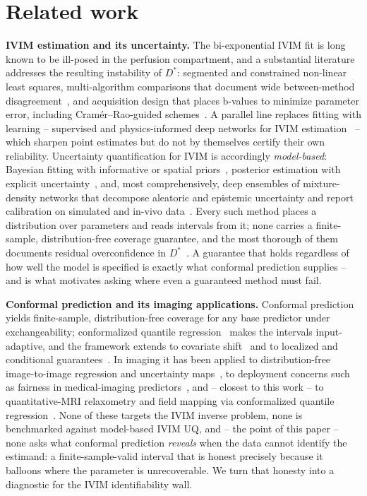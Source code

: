 \documentclass[11pt]{article}
\newcommand{\Dstar}{D^{*}}
\begin{document}
\section{Related work}\label{sec:related}
\textbf{IVIM estimation and its uncertainty.} The bi-exponential IVIM fit is long
known to be ill-posed in the perfusion compartment, and a substantial literature
addresses the resulting instability of $\Dstar$: segmented and constrained
non-linear least squares, multi-algorithm comparisons that document wide
between-method disagreement~\citep{gurneychampion2018}, and acquisition design that
places b-values to minimize parameter error, including Cram\'er--Rao-guided
schemes~\citep{lemke2011}. A parallel line replaces fitting with learning --
supervised and physics-informed deep networks for IVIM
estimation~\citep{barbieri2020,kaandorp2021,mastropietro2022} -- which sharpen
point estimates but do not by themselves certify their own reliability.
Uncertainty quantification for IVIM is accordingly \emph{model-based}: Bayesian
fitting with informative or spatial priors~\citep{gustafsson2018,spinner2021},
posterior estimation with explicit uncertainty~\citep{zhang2019}, and, most
comprehensively, deep ensembles of mixture-density networks that decompose
aleatoric and epistemic uncertainty and report calibration on simulated and in-vivo
data~\citep{casali2026}. Every such method places a distribution over parameters
and reads intervals from it; none carries a finite-sample, distribution-free
coverage guarantee, and the most thorough of them documents residual overconfidence
in $\Dstar$~\citep{casali2026}. A guarantee that holds regardless of how well the
model is specified is exactly what conformal prediction supplies -- and is what
motivates asking where even a guaranteed method must fail.

\textbf{Conformal prediction and its imaging applications.} Conformal
prediction~\citep{vovk2005,lei2018,angelopoulos2023} yields finite-sample,
distribution-free coverage for any base predictor under exchangeability;
conformalized quantile regression~\citep{romano2019} makes the intervals
input-adaptive, and the framework extends to covariate
shift~\citep{tibshirani2019,barber2023} and to localized and conditional
guarantees~\citep{guan2023,gibbs2023}. In imaging it has been applied to
distribution-free image-to-image regression and uncertainty
maps~\citep{angelopoulos2022}, to deployment concerns such as fairness in
medical-imaging predictors~\citep{lu2022}, and -- closest to this work -- to
quantitative-MRI relaxometry and field mapping via conformalized quantile
regression~\citep{birk2024}. None of these targets the IVIM inverse problem, none
is benchmarked against model-based IVIM UQ, and -- the point of this paper -- none
asks what conformal prediction \emph{reveals} when the data cannot identify the
estimand: a finite-sample-valid interval that is honest precisely because it
balloons where the parameter is unrecoverable. We turn that honesty into a
diagnostic for the IVIM identifiability wall.
\end{document}
